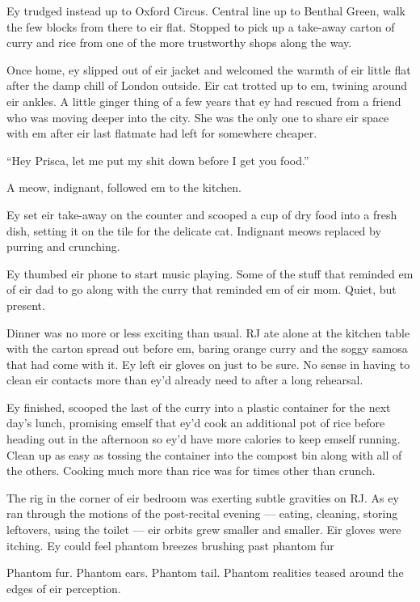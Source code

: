 Ey trudged instead up to Oxford Circus. Central line up to Benthal Green, walk the few blocks from there to eir flat. Stopped to pick up a take-away carton of curry and rice from one of the more trustworthy shops along the way.

Once home, ey slipped out of eir jacket and welcomed the warmth of eir little flat after the damp chill of London outside. Eir cat trotted up to em, twining around eir ankles. A little ginger thing of a few years that ey had rescued from a friend who was moving deeper into the city. She was the only one to share eir space with em after eir last flatmate had left for somewhere cheaper.

``Hey Prisca, let me put my shit down before I get you food.''

A meow, indignant, followed em to the kitchen.

Ey set eir take-away on the counter and scooped a cup of dry food into a fresh dish, setting it on the tile for the delicate cat. Indignant meows replaced by purring and crunching.

Ey thumbed eir phone to start music playing. Some of the stuff that reminded em of eir dad to go along with the curry that reminded em of eir mom. Quiet, but present.

Dinner was no more or less exciting than usual. RJ ate alone at the kitchen table with the carton spread out before em, baring orange curry and the soggy samosa that had come with it. Ey left eir gloves on just to be sure. No sense in having to clean eir contacts more than ey'd already need to after a long rehearsal.

Ey finished, scooped the last of the curry into a plastic container for the next day's lunch, promising emself that ey'd cook an additional pot of rice before heading out in the afternoon so ey'd have more calories to keep emself running. Clean up as easy as tossing the container into the compost bin along with all of the others. Cooking much more than rice was for times other than crunch.

The rig in the corner of eir bedroom was exerting subtle gravities on RJ. As ey ran through the motions of the post-recital evening — eating, cleaning, storing leftovers, using the toilet — eir orbits grew smaller and smaller. Eir gloves were itching. Ey could feel phantom breezes brushing past phantom fur

Phantom fur. Phantom ears. Phantom tail. Phantom realities teased around the edges of eir perception.

